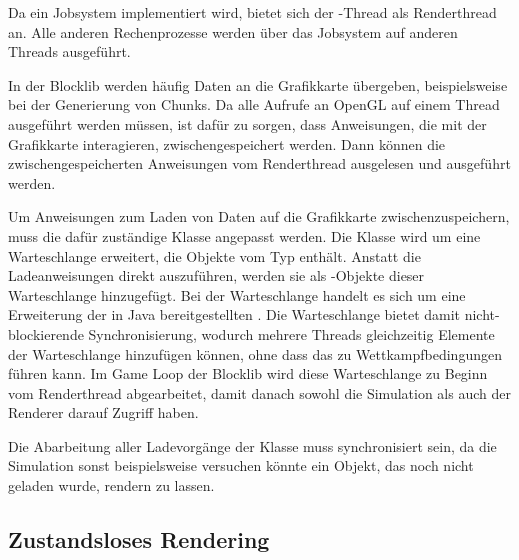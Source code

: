 Da ein Jobsystem implementiert wird, bietet sich der -Thread als Renderthread an. Alle anderen Rechenprozesse werden über das Jobsystem auf anderen Threads ausgeführt.

In der Blocklib werden häufig Daten an die Grafikkarte übergeben, beispielsweise bei der Generierung von Chunks. Da alle Aufrufe an OpenGL auf einem Thread ausgeführt werden müssen, ist dafür zu sorgen, dass Anweisungen, die mit der Grafikkarte interagieren, zwischengespeichert werden. Dann können die zwischengespeicherten Anweisungen vom Renderthread ausgelesen und ausgeführt werden. 

Um Anweisungen zum Laden von Daten auf die Grafikkarte zwischenzuspeichern, muss die dafür zuständige Klasse  angepasst werden. Die Klasse wird um eine Warteschlange erweitert, die Objekte vom Typ  enthält. Anstatt die Ladeanweisungen direkt auszuführen, werden sie als -Objekte dieser Warteschlange hinzugefügt. Bei der Warteschlange handelt es sich um eine Erweiterung der in Java bereitgestellten . Die Warteschlange bietet damit nicht-blockierende Synchronisierung, wodurch mehrere Threads gleichzeitig Elemente der Warteschlange hinzufügen können, ohne dass das zu Wettkampfbedingungen führen kann. Im Game Loop der Blocklib wird diese Warteschlange zu Beginn vom Renderthread abgearbeitet, damit danach sowohl die Simulation als auch der Renderer darauf Zugriff haben.

Die Abarbeitung aller Ladevorgänge der Klasse  muss synchronisiert sein, da die Simulation sonst beispielsweise versuchen könnte ein Objekt, das noch nicht geladen wurde, rendern zu lassen. 






\subsection{Zustandsloses Rendering}